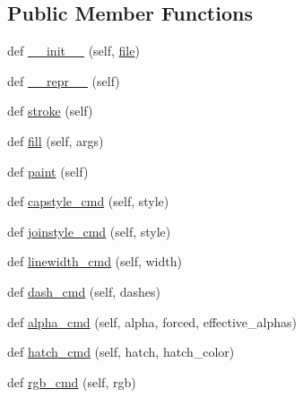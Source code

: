 \subsection*{Public Member Functions}
\begin{DoxyCompactItemize}
\item 
def \hyperlink{classmatplotlib_1_1backends_1_1backend__pdf_1_1GraphicsContextPdf_a9d4b12011a6db88031ecf330c5c1aa1f}{\+\_\+\+\_\+init\+\_\+\+\_\+} (self, \hyperlink{classmatplotlib_1_1backends_1_1backend__pdf_1_1GraphicsContextPdf_a5b5056a5bfa05653e5b803bb8387e10a}{file})
\item 
def \hyperlink{classmatplotlib_1_1backends_1_1backend__pdf_1_1GraphicsContextPdf_aa0ae92540f7731b7df968e59e277017d}{\+\_\+\+\_\+repr\+\_\+\+\_\+} (self)
\item 
def \hyperlink{classmatplotlib_1_1backends_1_1backend__pdf_1_1GraphicsContextPdf_ad4758ea89ed3d2ce4f8d4c23d6ef380c}{stroke} (self)
\item 
def \hyperlink{classmatplotlib_1_1backends_1_1backend__pdf_1_1GraphicsContextPdf_a6c2b48a1394ab4f4b6a2882bb09bd217}{fill} (self, args)
\item 
def \hyperlink{classmatplotlib_1_1backends_1_1backend__pdf_1_1GraphicsContextPdf_a939a3b22c5022c3e74e40b12f2a1a13f}{paint} (self)
\item 
def \hyperlink{classmatplotlib_1_1backends_1_1backend__pdf_1_1GraphicsContextPdf_a1e2e1731204faf8fdf2d2c91ef5934c4}{capstyle\+\_\+cmd} (self, style)
\item 
def \hyperlink{classmatplotlib_1_1backends_1_1backend__pdf_1_1GraphicsContextPdf_a0725e5e4d1b7db56d8e2b71e258663af}{joinstyle\+\_\+cmd} (self, style)
\item 
def \hyperlink{classmatplotlib_1_1backends_1_1backend__pdf_1_1GraphicsContextPdf_a095e8460361d46a54d8a64e1b283d868}{linewidth\+\_\+cmd} (self, width)
\item 
def \hyperlink{classmatplotlib_1_1backends_1_1backend__pdf_1_1GraphicsContextPdf_ab92fcc6ed823dd1b532fab026df38507}{dash\+\_\+cmd} (self, dashes)
\item 
def \hyperlink{classmatplotlib_1_1backends_1_1backend__pdf_1_1GraphicsContextPdf_aeec78fca223c1797920db0082147a32a}{alpha\+\_\+cmd} (self, alpha, forced, effective\+\_\+alphas)
\item 
def \hyperlink{classmatplotlib_1_1backends_1_1backend__pdf_1_1GraphicsContextPdf_a1baaa4fe2ad6b32b2e93bcecb4d3c3c6}{hatch\+\_\+cmd} (self, hatch, hatch\+\_\+color)
\item 
def \hyperlink{classmatplotlib_1_1backends_1_1backend__pdf_1_1GraphicsContextPdf_a51d6926832cf01893d9bbb0eb518cfff}{rgb\+\_\+cmd} (self, rgb)

\end{DoxyCompactItemize}
